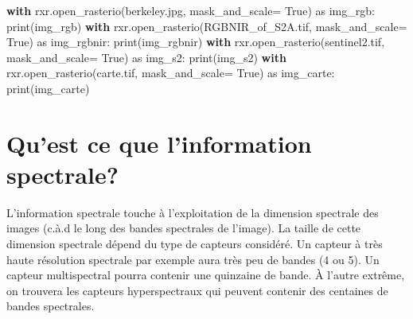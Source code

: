 \documentclass[
  11pt,
  letterpaper,
  open=any,
  twoside=false,
  french]{scrbook}
\newenvironment{Shaded}{\begin{snugshade}}{\end{snugshade}}
\newcommand{\BuiltInTok}[1]{\textcolor[rgb]{0.00,0.23,0.31}{#1}}
\newcommand{\ControlFlowTok}[1]{\textcolor[rgb]{0.00,0.23,0.31}{\textbf{#1}}}
\newcommand{\ImportTok}[1]{\textcolor[rgb]{0.00,0.46,0.62}{#1}}
\newcommand{\NormalTok}[1]{\textcolor[rgb]{0.00,0.23,0.31}{#1}}
\newcommand{\OperatorTok}[1]{\textcolor[rgb]{0.37,0.37,0.37}{#1}}
\newcommand{\StringTok}[1]{\textcolor[rgb]{0.13,0.47,0.30}{#1}}
\newcommand{\VariableTok}[1]{\textcolor[rgb]{0.07,0.07,0.07}{#1}}
\begin{document}
\begin{Shaded}
\begin{Highlighting}[]
\ControlFlowTok{with}\NormalTok{ rxr.open\_rasterio(}\StringTok{\textquotesingle{}berkeley.jpg\textquotesingle{}}\NormalTok{, mask\_and\_scale}\OperatorTok{=} \VariableTok{True}\NormalTok{) }\ImportTok{as}\NormalTok{ img\_rgb:}
    \BuiltInTok{print}\NormalTok{(img\_rgb)}
\ControlFlowTok{with}\NormalTok{ rxr.open\_rasterio(}\StringTok{\textquotesingle{}RGBNIR\_of\_S2A.tif\textquotesingle{}}\NormalTok{, mask\_and\_scale}\OperatorTok{=} \VariableTok{True}\NormalTok{) }\ImportTok{as}\NormalTok{ img\_rgbnir:}
    \BuiltInTok{print}\NormalTok{(img\_rgbnir)}
\ControlFlowTok{with}\NormalTok{ rxr.open\_rasterio(}\StringTok{\textquotesingle{}sentinel2.tif\textquotesingle{}}\NormalTok{, mask\_and\_scale}\OperatorTok{=} \VariableTok{True}\NormalTok{) }\ImportTok{as}\NormalTok{ img\_s2:}
    \BuiltInTok{print}\NormalTok{(img\_s2)}
\ControlFlowTok{with}\NormalTok{ rxr.open\_rasterio(}\StringTok{\textquotesingle{}carte.tif\textquotesingle{}}\NormalTok{, mask\_and\_scale}\OperatorTok{=} \VariableTok{True}\NormalTok{) }\ImportTok{as}\NormalTok{ img\_carte:}
    \BuiltInTok{print}\NormalTok{(img\_carte)}
\end{Highlighting}
\end{Shaded}

\section{Qu'est ce que l'information
spectrale?}\label{quest-ce-que-linformation-spectrale}

L'information spectrale touche à l'exploitation de la dimension
spectrale des images (c.à.d le long des bandes spectrales de l'image).
La taille de cette dimension spectrale dépend du type de capteurs
considéré. Un capteur à très haute résolution spectrale par exemple aura
très peu de bandes (4 ou 5). Un capteur multispectral pourra contenir
une quinzaine de bande. À l'autre extrême, on trouvera les capteurs
hyperspectraux qui peuvent contenir des centaines de bandes spectrales.
\end{document}
